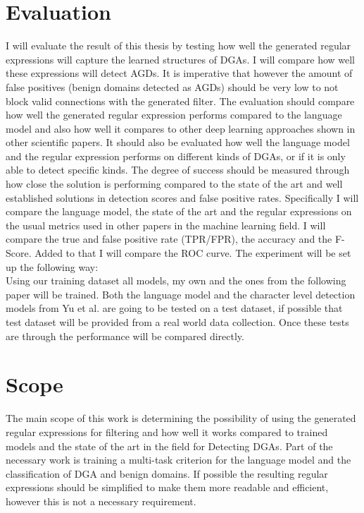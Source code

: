 \documentclass[a4paper, 12pt]{article}
\begin{document}
\section{Evaluation}
I will evaluate the result of this thesis by testing how well the generated regular expressions
will capture the learned structures of DGAs. I will compare how well these expressions will detect
AGDs. It is imperative that however the amount of false positives (benign domains detected as AGDs)
should be very low to not block valid connections with the generated filter.
The evaluation should compare how well the generated regular expression performs compared to the
language model and also how well it compares to other deep learning approaches shown in other
scientific papers. It should also be evaluated how well the language model and the regular
expression performs on different kinds of DGAs, or if it is only able to detect specific kinds. 
The degree of success should be measured through how close the solution is performing compared to
the state of the art and well established solutions in detection scores and false positive rates.
Specifically I will compare the language model, the state of the art and the regular expressions on
the usual metrics used in other papers in the machine learning field. 
I will compare the true and false positive rate (TPR/FPR), the accuracy and the F-Score. 
Added to that I will compare the ROC curve.
The experiment will be set up the following way:\\
Using our training dataset all models, my own and the ones from the following paper
\cite{yu_character_2018} will be trained. Both the language model and the character level detection models
from Yu et al. are going to be tested on a test dataset, if possible that test dataset will be
provided from a real world data collection. Once these tests are through the performance will be
compared directly.
\section{Scope}
The main scope of this work is determining the possibility of using the generated regular
expressions for
filtering and how well it works compared to trained models and the state of the art in the field for
Detecting DGAs. Part of the necessary work is training a multi-task criterion for the language model
and the classification of DGA and benign domains. If possible the resulting regular expressions
should be simplified to make them more readable and efficient, however this is not a necessary
requirement.
\end{document}
